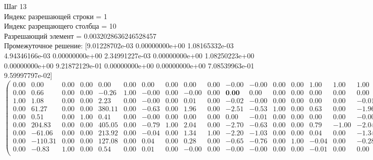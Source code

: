 \documentclass{article}
\begin{document}
\begin{flushleft}
    Шаг 13\\
Индекс разрешающей строки = 1\\
Индекс разрещающего столбца = 10\\
Разрешающий элемент = 0.0032028636246528457\\
Промежуточное решение:
 [9.01228702e-03 0.00000000e+00 1.08165332e-03 4.94346166e-03
 0.00000000e+00 2.34991227e-03 0.00000000e+00 1.08250223e+00
 0.00000000e+00 9.21872129e-01 0.00000000e+00 0.00000000e+00
 7.08539963e-01 9.59997797e-02]
\begin{equation*}
\begin{pmatrix}
 0.00 &    0.00 & 0.00 & 0.00 &   0.00 & 0.00 &  0.00 & 0.00 &  0.00 & 0.00 & -0.00 & -0.00 & 0.00 & 0.00 &  1.00 &  1.00 &  1.00 &  1.00 &  1.00 &  1.00 &  1.00 &  1.00 & -0.00 \\
 0.00 &    0.66 & 0.00 & 0.00 &  -0.26 & 1.00 & -0.00 & 0.00 & -0.00 & 0.00 &  \textbf{0.00} &  0.00 & 0.00 & 0.00 &  0.00 &  0.00 &  0.00 &  0.00 & -0.00 & -0.00 &  0.00 &  0.00 &  0.00 \\
 1.00 &    1.08 & 0.00 & 0.00 &   2.23 & 0.00 & -0.00 & 0.00 &  0.01 & 0.00 & -0.02 & -0.00 & 0.00 & 0.00 &  0.00 &  0.00 & -0.01 &  0.00 &  0.02 &  0.00 &  0.00 &  0.00 &  0.01 \\
 0.00 &   61.27 & 0.00 & 0.00 & 380.11 & 0.00 & -0.63 & 0.00 &  1.96 & 0.00 & -2.51 & -0.53 & 1.00 & 0.00 &  0.63 &  0.00 & -1.96 &  0.00 &  2.51 &  0.53 & -1.00 &  0.00 &  0.71 \\
 0.00 &    0.51 & 0.00 & 1.00 &   0.41 & 0.00 & -0.00 & 0.00 &  0.00 & 0.00 &  0.00 & -0.01 & 0.00 & 0.00 &  0.00 &  0.00 & -0.00 &  0.00 & -0.00 &  0.01 &  0.00 &  0.00 &  0.00 \\
 0.00 &  204.83 & 0.00 & 0.00 & 405.05 & 0.00 & -0.79 & 1.00 &  2.04 & 0.00 & -2.70 & -0.63 & 0.00 & 0.00 &  0.79 & -1.00 & -2.04 &  0.00 &  2.70 &  0.63 &  0.00 &  0.00 &  1.08 \\
 0.00 &  -61.06 & 0.00 & 0.00 & 213.92 & 0.00 & -0.04 & 0.00 &  1.34 & 1.00 & -2.20 & -1.03 & 0.00 & 0.00 &  0.04 &  0.00 & -1.34 & -1.00 &  2.20 &  1.03 &  0.00 &  0.00 &  0.92 \\
 0.00 & -110.31 & 0.00 & 0.00 & 127.08 & 0.00 &  0.04 & 0.00 &  0.28 & 0.00 & -0.65 & -0.76 & 0.00 & 1.00 & -0.04 &  0.00 & -0.28 &  0.00 &  0.65 &  0.76 &  0.00 & -1.00 &  0.10 \\
 0.00 &   -0.83 & 1.00 & 0.00 &   0.54 & 0.00 &  0.01 & 0.00 & -0.00 & 0.00 & -0.00 & -0.00 & 0.00 & 0.00 & -0.01 &  0.00 &  0.00 &  0.00 &  0.00 &  0.00 &  0.00 &  0.00 &  0.00 \\
\end{pmatrix}
\end{equation*}
\end{flushleft}
\end{document}
